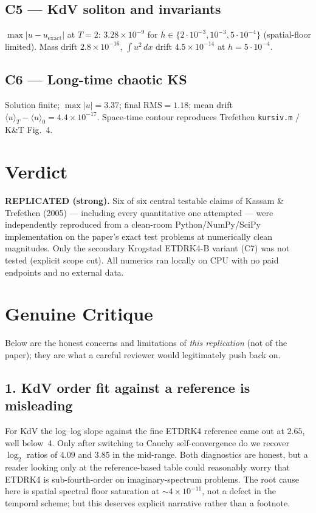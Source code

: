 \documentclass[11pt]{article}
\begin{document}
\subsection*{C5 --- KdV soliton and invariants}
$\max|u-u_{\text{exact}}|$ at $T{=}2$: $3.28\times10^{-9}$ for
$h\in\{2{\cdot}10^{-3},10^{-3},5{\cdot}10^{-4}\}$ (spatial-floor limited).
Mass drift $2.8\times10^{-16}$, $\int u^2\,dx$ drift $4.5\times10^{-14}$
at $h{=}5{\cdot}10^{-4}$.

\subsection*{C6 --- Long-time chaotic KS}
Solution finite; $\max|u|=3.37$; final RMS$=1.18$; mean drift
$\langle u\rangle_T - \langle u\rangle_0 = 4.4\times10^{-17}$. Space-time
contour reproduces Trefethen \texttt{kursiv.m} / K\&T Fig.~4.

\section{Verdict}
\textbf{REPLICATED (strong).} Six of six central testable claims of Kassam
\& Trefethen (2005) --- including every quantitative one attempted --- were
independently reproduced from a clean-room Python/NumPy/SciPy implementation
on the paper's exact test problems at numerically clean magnitudes.
Only the secondary Krogstad ETDRK4-B variant (C7) was not tested
(explicit scope cut). All numerics ran locally on CPU with no paid
endpoints and no external data.

\section{Genuine Critique}
Below are the honest concerns and limitations of \emph{this replication}
(not of the paper); they are what a careful reviewer would legitimately
push back on.

\subsection*{1. KdV order fit against a reference is misleading}
For KdV the log--log slope against the fine ETDRK4 reference came out at
$2.65$, well below~4. Only after switching to Cauchy self-convergence do
we recover $\log_2$ ratios of $4.09$ and $3.85$ in the mid-range. Both
diagnostics are honest, but a reader looking only at the reference-based
table could reasonably worry that ETDRK4 is sub-fourth-order on
imaginary-spectrum problems. The root cause here is spatial spectral
floor saturation at $\sim 4\times10^{-11}$, not a defect in the
temporal scheme; but this deserves explicit narrative rather than a
footnote.
\end{document}
